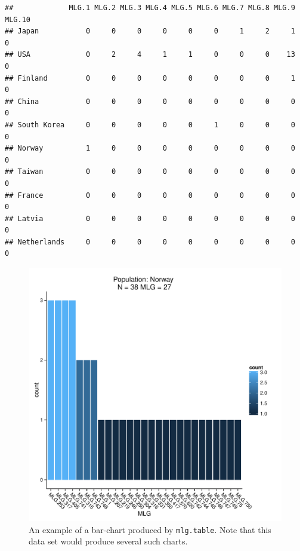 \documentclass[letterpaper]{article}\usepackage[]{graphicx}\usepackage[]{color}
\makeatletter
\newenvironment{kframe}{%
 \def\at@end@of@kframe{}%
 \ifinner\ifhmode%
  \def\at@end@of@kframe{\end{minipage}}%
  \begin{minipage}{\columnwidth}%
 \fi\fi%
 \def\FrameCommand##1{\hskip\@totalleftmargin \hskip-\fboxsep
 \colorbox{shadecolor}{##1}\hskip-\fboxsep
     \hskip-\linewidth \hskip-\@totalleftmargin \hskip\columnwidth}%
 \MakeFramed {\advance\hsize-\width
   \@totalleftmargin\z@ \linewidth\hsize
   \@setminipage}}%
 {\par\unskip\endMakeFramed%
 \at@end@of@kframe}
\newenvironment{knitrout}{}{} %
\makeatother
\begin{document}
\begin{knitrout}\footnotesize
{}\color{fgcolor}\begin{kframe}
\begin{verbatim}
##             MLG.1 MLG.2 MLG.3 MLG.4 MLG.5 MLG.6 MLG.7 MLG.8 MLG.9 MLG.10
## Japan           0     0     0     0     0     0     1     2     1      0
## USA             0     2     4     1     1     0     0     0    13      0
## Finland         0     0     0     0     0     0     0     0     1      0
## China           0     0     0     0     0     0     0     0     0      0
## South Korea     0     0     0     0     0     1     0     0     0      0
## Norway          1     0     0     0     0     0     0     0     0      0
## Taiwan          0     0     0     0     0     0     0     0     0      0
## France          0     0     0     0     0     0     0     0     0      0
## Latvia          0     0     0     0     0     0     0     0     0      0
## Netherlands     0     0     0     0     0     0     0     0     0      0
\end{verbatim}
\end{kframe}
\end{knitrout}

\begin{figure}[h!]
  \centering
  \caption{\footnotesize An example of a bar-chart produced by \texttt{mlg.table}. Note that this data set would produce several such charts.}
  \label{nortable}
\begin{knitrout}\footnotesize
{}\color{fgcolor}

{\centering \includegraphics[width=0.5\linewidth]{figure/mlgbarplot} 

}



\end{knitrout}

\end{figure}
\newpage
\end{document}

